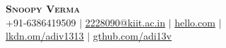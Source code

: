 \documentclass[A4,11pt]{article}
\begin{document}
\begin{comment}
In Europe it is common to include a picture of ones self in the CV. Select
which heading appropriate for the document you are creating.
\end{comment}


\begin{center}
    \textbf{\Huge \scshape Snoopy Verma} \\ \vspace{1pt} %
    \small +91-6386419509 $|$ 
    \href{mailto:2228090@kiit.ac.in}{\underline{2228090@kiit.ac.in}} $|$ \href{https://hello.com}{\underline{hello.com}}  $|$ \\ 
    \href{https://lkdn.om/adiv1313}{\underline{lkdn.om/adiv1313}}  $|$
    \href{https://gthub.com/adi13v}{\underline{gthub.com/adi13v}}
\end{center}
  




\begin{comment}
This CV was written for specifically for positions I was applying for in
academia, and then modified to be a template.

A standard CV is about two pages long where as a resume in the US is one page.
sections can be added and removed here with this in mind. In my experience, 
education, and applicable work experience and skills are the most import things
to include on a resume. For a CV the Europass CV suggests the categories: Work
Experience, Education and Training, Language Skills, Digital Skills,
Communication and Interpersonal Skills, Conferences and Seminars, Creative Works
Driver's License, Hobbies and Interests, Honors and Awards, Management and
Leadership Skills, Networks and Memberships, Organizational Skills, Projects,
Publications, Recommendations, Social and Political Activities, Volunteering.

Your goal is to convey a who, what , when, where, why for every item you share. 
The who is obviously you, but I believe the rest should be done in that order.
For example below. An employer cares most about the degree held and typically 
less about the institution or where it is located (This is still good 
information though). Whatever order you choose be consistent throughout.
\end{comment}
\end{document}

